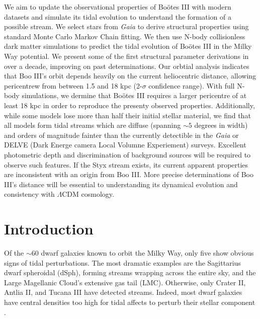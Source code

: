 \documentclass{aa}
\newcommand{\bootes}{Bo\"otes III}
\newcommand{\boo}{Boo III}
\begin{document}
  \abstract
   {}
   {We aim to update the observational properties of \bootes{} with modern datasets and simulate its tidal evolution to understand the formation of a possible stream.} 
   {We select stars from \textit{Gaia} to derive structural properties using standard Monte Carlo Markov Chain fitting. We then use N-body collisionless dark matter simulations to predict the tidal evolution of \bootes{} in the Milky Way potential.
   }
   {We present some of the first structural parameter derivations in over a decade, improving on past determinations. Our orbtial analysis indicates that \boo{}'s orbit depends heavily on the current heliocentric distance, allowing pericentrew from between 1.5 and 18 kpc (2-$\sigma$ confidence range). With full N-body simulations, we dermine that \bootes{} requires a larger pericentre of at least 18 kpc in order to reproduce the presenty observed properties. Additionally, while some models lose more than half their initial stellar material, we find that all models form tidal streams which are diffuse (spanning $\sim 5$ degrees in width) and orders of magnitude fainter than the currently detectible in the \textit{Gaia} or DELVE (Dark Energe camera Local Volumne Experiement) surveys. Excellent photometric depth and discrimination of background sources will be required to observe such features. 
   }
   {
       If the Styx stream exists, its current apparent properties are inconsistent with an origin from \boo{}.  More precise determinations of \boo{}'s distance will be essential to understanding its dynamical evolution and consistency with $\Lambda$CDM cosmology. 
   }


   \maketitle


\section{Introduction}

Of the ${\sim}60$ dwarf galaxies known to orbit the Milky Way, only five show obvious signs of tidal perturbations. The most dramatic examples are the Sagittarius dwarf spheroidal (dSph), forming streams wrapping across the entire sky, and the Large Magellanic Cloud's extensive gas tail (LMC). Otherwise, only Crater II, Antlia II, and Tucana III have detected streams. Indeed, most dwarf galaxies have central densities too high for tidal affects to perturb their stellar component \citep[e.g.,][]{pace+2020}.
\end{document}

